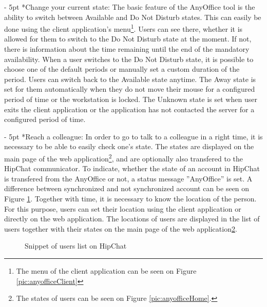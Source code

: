 \documentclass[11pt,singleside]{myfithesis2}
\makeatletter
\newcommand{\pict}[4]{
	\begin{figure}[h!]
  		\vspace{-7px}
  		\centerline{\fcolorbox{darkgray}{palegray}{\texttt{[image: \#2]}}}
  		\caption{#1}
  		\label{#4}
	\end{figure}
}
\renewcommand\paragraph{
   \vspace{-10pt}
   \@startsection{paragraph}{4}{0mm}
      {\baselineskip}
      {- 5pt}
      {\normalfont\normalsize\bfseries}
}
\makeatother
\begin{document}
\paragraph*{Change your current state: } The basic feature of the AnyOffice tool is the ability to switch between Available and Do Not Disturb states. This can easily be done using the client application's menu\footnote{\label{clientNote}The menu of the client application can be seen on Figure \ref{pic:anyofficeClient}}. Users can see there, whether it is allowed for them to switch to the Do Not Disturb state at the moment. If not, there is information about the time remaining until the end of the mandatory availability. When a user switches to the Do Not Disturb state, it is possible to choose one of the default periods or manually set a custom duration of the period. Users can switch back to the Available state anytime. The Away state is set for them automatically when they do not move their mouse for a configured period of time or the workstation is locked. The Unknown state is set when user exits the client application or the application has not contacted the server for a configured period of time.

\paragraph*{Reach a colleague: } In order to go to talk to a colleague in a right time, it is necessary to be able to easily check one's state. The states are displayed on the main page of the web application\footnote{\label{mainPage}The states of users can be seen on Figure \ref{pic:anyofficeHome}.}, and are optionally also transfered to the HipChat communicator. To indicate, whether the state of an account in HipChat is transfered from the AnyOffice or not, a status message ''AnyOffice'' is set. A difference between synchronized and not synchronized account can be seen on Figure \ref{pic:hipchatStatus}. Together with time, it is necessary to know the location of the person. For this purpose, users can set their location using the client application or directly on the web application. The locations of users are displayed in the list of users together with their states on the main page of the web application\cref{mainPage}.

\pict{Snippet of users list on HipChat}{data/hipchatStatus.png}{width=0.2\textwidth}{pic:hipchatStatus} 
\end{document}
